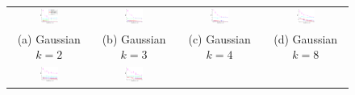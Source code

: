 \documentclass{article}
\begin{document}
\begin{figure}[!t]
  \centering
  \hspace{-6mm}
  \renewcommand{\tabcolsep}{1pt}
  \begin{tabular}{cccc}
    \includegraphics[width=0.24\textwidth]{../experiment/figure_new/sp_diff_gauss_k_2_view_2-crop} &
    \includegraphics[width=0.24\textwidth]{../experiment/figure_new/sp_diff_gauss_k_3_view_3-crop} &
    \includegraphics[width=0.24\textwidth]{../experiment/figure_new/sp_diff_gauss_k_4_view_1-crop} &
    \includegraphics[width=0.24\textwidth]{../experiment/figure_new/sp_diff_gauss_k_8_view_1-crop} \\[-1mm]
    (a) Gaussian $k=2$ & (b) Gaussian $k=3$ & (c) Gaussian $k=4$ & (d) Gaussian $k=8$ \\[-1mm]
    \includegraphics[width=0.24\textwidth]{../experiment/figure_new/sp_diff_heter_k_2_view_2-crop} &
    \includegraphics[width=0.24\textwidth]{../experiment/figure_new/sp_diff_heter_k_3_view_3-crop} &

\end{tabular}
\end{figure}
\end{document}
